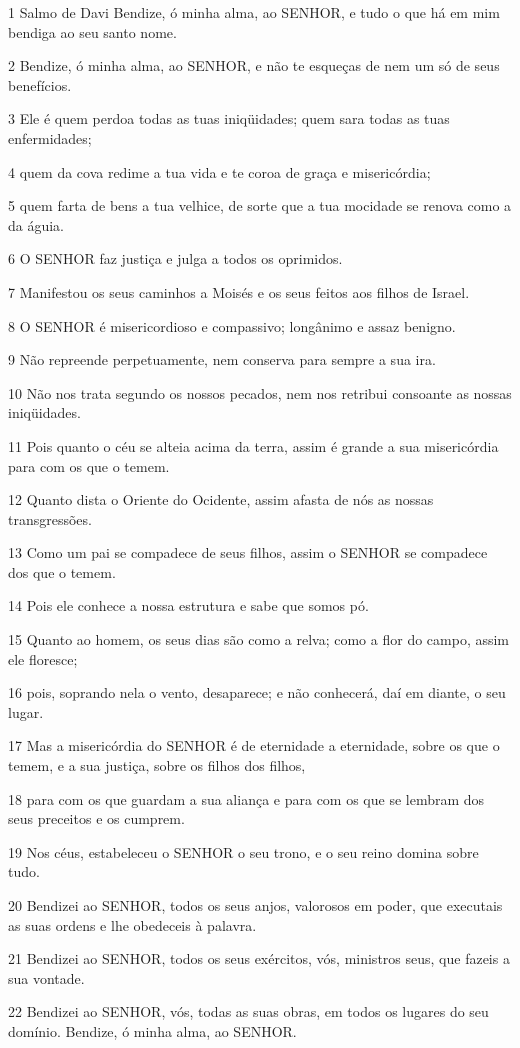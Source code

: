 \par 1 Salmo de Davi Bendize, ó minha alma, ao SENHOR, e tudo o que há em mim bendiga ao seu santo nome.
\par 2 Bendize, ó minha alma, ao SENHOR, e não te esqueças de nem um só de seus benefícios.
\par 3 Ele é quem perdoa todas as tuas iniqüidades; quem sara todas as tuas enfermidades;
\par 4 quem da cova redime a tua vida e te coroa de graça e misericórdia;
\par 5 quem farta de bens a tua velhice, de sorte que a tua mocidade se renova como a da águia.
\par 6 O SENHOR faz justiça e julga a todos os oprimidos.
\par 7 Manifestou os seus caminhos a Moisés e os seus feitos aos filhos de Israel.
\par 8 O SENHOR é misericordioso e compassivo; longânimo e assaz benigno.
\par 9 Não repreende perpetuamente, nem conserva para sempre a sua ira.
\par 10 Não nos trata segundo os nossos pecados, nem nos retribui consoante as nossas iniqüidades.
\par 11 Pois quanto o céu se alteia acima da terra, assim é grande a sua misericórdia para com os que o temem.
\par 12 Quanto dista o Oriente do Ocidente, assim afasta de nós as nossas transgressões.
\par 13 Como um pai se compadece de seus filhos, assim o SENHOR se compadece dos que o temem.
\par 14 Pois ele conhece a nossa estrutura e sabe que somos pó.
\par 15 Quanto ao homem, os seus dias são como a relva; como a flor do campo, assim ele floresce;
\par 16 pois, soprando nela o vento, desaparece; e não conhecerá, daí em diante, o seu lugar.
\par 17 Mas a misericórdia do SENHOR é de eternidade a eternidade, sobre os que o temem, e a sua justiça, sobre os filhos dos filhos,
\par 18 para com os que guardam a sua aliança e para com os que se lembram dos seus preceitos e os cumprem.
\par 19 Nos céus, estabeleceu o SENHOR o seu trono, e o seu reino domina sobre tudo.
\par 20 Bendizei ao SENHOR, todos os seus anjos, valorosos em poder, que executais as suas ordens e lhe obedeceis à palavra.
\par 21 Bendizei ao SENHOR, todos os seus exércitos, vós, ministros seus, que fazeis a sua vontade.
\par 22 Bendizei ao SENHOR, vós, todas as suas obras, em todos os lugares do seu domínio. Bendize, ó minha alma, ao SENHOR.


